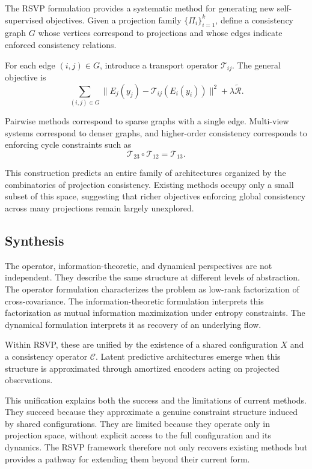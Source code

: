 \documentclass[12pt, oneside]{article}
\begin{document}
The RSVP formulation provides a systematic method for generating new self-supervised objectives. Given a projection family $\{\Pi_i\}_{i=1}^k$, define a consistency graph $G$ whose vertices correspond to projections and whose edges indicate enforced consistency relations.

For each edge $(i,j) \in G$, introduce a transport operator $\mathcal{T}_{ij}$. The general objective is
\[
\sum_{(i,j) \in G}
\| E_j(y_j) - \mathcal{T}_{ij}(E_i(y_i)) \|^2
+ \lambda \widetilde{\mathcal{R}}.
\]

Pairwise methods correspond to sparse graphs with a single edge. Multi-view systems correspond to denser graphs, and higher-order consistency corresponds to enforcing cycle constraints such as
\[
\mathcal{T}_{23} \circ \mathcal{T}_{12} = \mathcal{T}_{13}.
\]

This construction predicts an entire family of architectures organized by the combinatorics of projection consistency. Existing methods occupy only a small subset of this space, suggesting that richer objectives enforcing global consistency across many projections remain largely unexplored.

\subsection{Synthesis}

The operator, information-theoretic, and dynamical perspectives are not independent. They describe the same structure at different levels of abstraction. The operator formulation characterizes the problem as low-rank factorization of cross-covariance. The information-theoretic formulation interprets this factorization as mutual information maximization under entropy constraints. The dynamical formulation interprets it as recovery of an underlying flow.

Within RSVP, these are unified by the existence of a shared configuration $X$ and a consistency operator $\mathcal{C}$. Latent predictive architectures emerge when this structure is approximated through amortized encoders acting on projected observations.

This unification explains both the success and the limitations of current methods. They succeed because they approximate a genuine constraint structure induced by shared configurations. They are limited because they operate only in projection space, without explicit access to the full configuration and its dynamics. The RSVP framework therefore not only recovers existing methods but provides a pathway for extending them beyond their current form.
\end{document}
